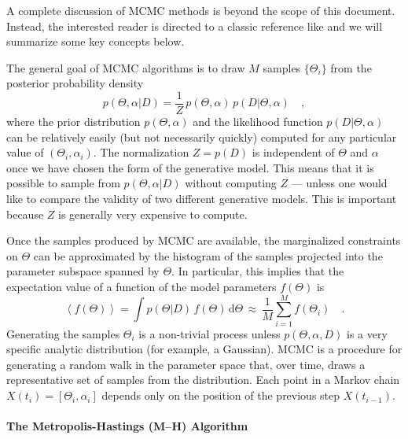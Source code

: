 \documentclass[12pt,preprint]{aastex}
\newcommand{\paper}{document}
\newcommand{\dd}{\mathrm{d}}
\renewcommand{\vector}[1]{#1}
\newcommand{\pr}[1]{\ensuremath{p(#1)}}
\newcommand{\expect}[1]{\left<#1\right>}
\newcommand{\model}{\ensuremath{\vector{\Theta}}}
\newcommand{\data}{\ensuremath{\vector{D}}}
\newcommand{\nuisance}{\ensuremath{\vector{\alpha}}}
\newcommand{\link}{\ensuremath{X}}
\begin{document}
A complete discussion of MCMC methods is beyond the scope of this \paper.
Instead, the interested reader is directed to a classic reference like
\citet{MacKay:2003} and we will summarize some key concepts below.

The general goal of MCMC algorithms is to draw $M$ samples
$\{ \model_i \}$ from
the posterior probability density
\begin{equation}
    \pr{\model, \nuisance | \data} = \frac{1}{Z}\,\pr{\model, \nuisance}
            \, \pr{\data | \model, \nuisance} \quad,
\end{equation}
where the prior distribution $\pr{\model, \nuisance}$ and the likelihood
function $\pr{\data|\model,\nuisance}$ can be relatively easily (but not
necessarily quickly) computed for any particular value of
$(\model_i, \nuisance_i)$.  The normalization $Z=\pr{\data}$ is
independent of $\model$ and $\nuisance$ once we have chosen the form of the
generative model. This means that it is possible
to sample from \pr{\model, \nuisance | \data} without computing $Z$ ---
unless one would like to compare the validity of two different generative
models. This is important because $Z$ is generally very expensive to
compute.

Once the samples
produced by MCMC are available, the marginalized constraints on $\model$
can be approximated by
the histogram of the samples projected into the parameter subspace spanned
by $\model$. In particular, this implies that the
expectation value of a function of the model parameters $f(\model)$ is
\begin{equation}
    \expect{f(\model)} = \int
    \pr{\model|\data}
    \, f(\model) \, \dd\model
    \,\approx\, \frac{1}{M} \sum_{i=1} ^M f(\model_i) \quad.
\end{equation}
Generating the samples $\model_i$ is a non-trivial process unless
$\pr{\model, \nuisance, \data}$ is a very specific analytic distribution
(for example, a Gaussian). MCMC is a procedure for generating a random walk
in the parameter space that, over time, draws a representative set
of samples from the distribution. Each point in a Markov chain
$\link (t_i) = [\model_i, \nuisance_i]$
depends only on the position of the previous step $\link (t_{i-1})$.

\paragraph{The Metropolis-Hastings (M--H) Algorithm}
\end{document}

